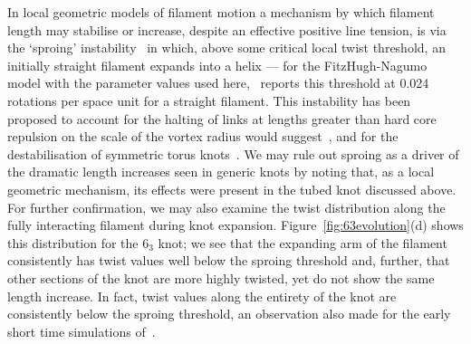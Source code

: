 In local geometric models of filament motion a mechanism by which filament length may stabilise or increase, despite an effective positive line tension, is via the `sproing' instability~\citep{WinfreeChapter} in which, above some critical local twist threshold, an initially straight filament expands into a helix --- for the FitzHugh-Nagumo model with the parameter values used here,~\citep{Henze1993} reports this threshold at 0.024 rotations per space unit for a straight filament. This instability has been proposed to account for the halting of links at lengths greater than hard core repulsion on the scale of the vortex radius would suggest~\citep{WinfreeChapter}, and for the destabilisation of symmetric torus knots~\citep{Maucher2017}. We may rule out sproing as a driver of the dramatic length increases seen in generic knots by noting that, as a local geometric mechanism, its effects were present in the tubed knot discussed above. For further confirmation, we may also examine the twist distribution along the fully interacting filament during knot expansion. Figure~\ref{fig:63evolution}(d) shows this distribution for the $6_3$ knot; we see that the expanding arm of the filament consistently has twist values well below the sproing threshold and, further, that other sections of the knot are more highly twisted, yet do not show the same length increase. In fact, twist values along the entirety of the knot are consistently below the sproing threshold, an observation also made for the early short time simulations of~\citep{Henze1993,WinfreeChapter}. 

